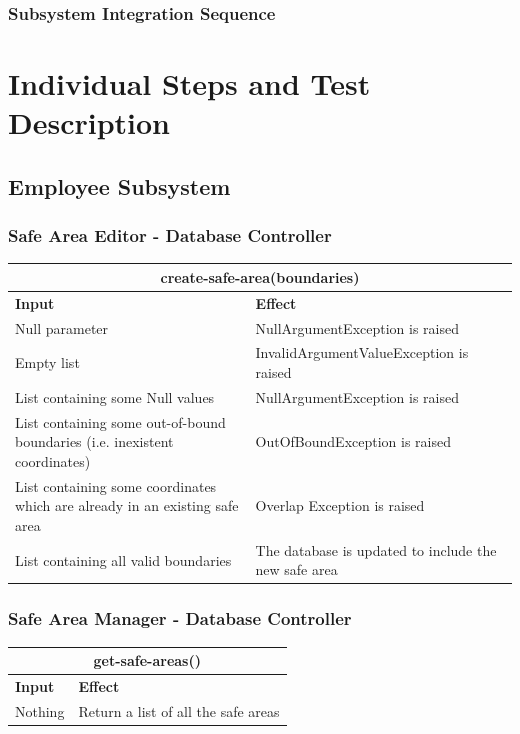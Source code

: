 \documentclass{article}
\begin{document}


\subsubsection{Subsystem Integration Sequence}


\newpage
\section{Individual Steps and Test Description}
\subsection{Employee Subsystem}
\subsubsection{Safe Area Editor - Database Controller}
\begin{tabular}{ |p{5cm}|p{7cm}| }
  \hline
  \multicolumn{2}{|c|}{create-safe-area(boundaries)} \\
  \hline
  \textbf{Input} & \textbf{Effect} \\
  \hline
  Null parameter & NullArgumentException is raised\\
  \hline
  Empty list & InvalidArgumentValueException is raised\\
  \hline
  List containing some Null values & NullArgumentException is raised\\
  \hline
  List containing some out-of-bound boundaries (i.e. inexistent coordinates) & OutOfBoundException is raised\\
  \hline
  List containing some coordinates which are already in an existing safe area & Overlap Exception is raised\\
  \hline
  List containing all valid boundaries & The database is updated to include the new safe area\\
  \hline
\end{tabular}
\subsubsection{Safe Area Manager - Database Controller}
\begin{tabular}{ |p{5cm}|p{7cm}| }
  \hline
  \multicolumn{2}{|c|}{get-safe-areas()} \\
  \hline
  \textbf{Input} & \textbf{Effect} \\
  \hline
  Nothing & Return a list of all the safe areas\\
  \hline
\end{tabular}
\end{document}
